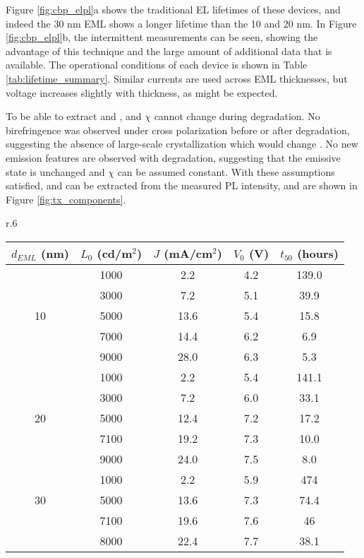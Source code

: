 \documentclass[../thesis.tex]{subfiles}
\begin{document}
Figure \ref{fig:cbp_elpl}a shows the traditional EL lifetimes of these devices, and indeed the 30 nm EML shows a longer lifetime than the 10 and 20 nm.  
In Figure \ref{fig:cbp_elpl}b, the intermittent \pl measurements can be seen, showing the advantage of this technique and the large amount of additional data that is available.
The operational conditions of each device is shown in Table \ref{tab:lifetime_summary}.
Similar currents are used across EML thicknesses, but voltage increases slightly with thickness, as might be expected.


To be able to extract \pl and \ef, \oc and $\chi$ cannot change during degradation.
No birefringence was observed under cross polarization before or after degradation, suggesting the absence of large-scale crystallization which would change \oc .  
No new emission features are observed with degradation, suggesting that the emissive state is unchanged and $\chi$ can be assumed constant.
With these assumptions satisfied, \pl and \ef can be extracted from the measured PL intensity, and are shown in Figure \ref{fig:tx_components}.


\begin{wraptable}{r}{.6\textwidth}%
\centering
\begin{tabular}{c|c|c|c|c}
$d_{EML}$ (nm) & $L_0$ (cd/m$^2$) & $J$ (mA/cm$^2$) & $V_0$ (V) & $t_{50}$ (hours) \\
\hline
& 1000 & 2.2 & 4.2 & 139.0 \\
& 3000 & 7.2 & 5.1 & 39.9 \\
10 & 5000 & 13.6 & 5.4 & 15.8 \\
& 7000 & 14.4 & 6.2 & 6.9 \\
& 9000 & 28.0 &  6.3 & 5.3 \\
\hline
& 1000 & 2.2 & 5.4 & 141.1 \\
& 3000 & 7.2 & 6.0 & 33.1 \\
20 & 5000 & 12.4 & 7.2 & 17.2 \\
& 7100 & 19.2 & 7.3 & 10.0 \\
& 9000 & 24.0 &  7.5 & 8.0 \\
\hline
& 1000 & 2.2 & 5.9 & 474 \\
30 & 5000 & 13.6 & 7.3 & 74.4\\
& 7100 & 19.6 & 7.6 & 46 \\
& 8000 & 22.4 &  7.7 & 38.1 \\

\end{tabular}
\caption{Summary of device lifetimes.  For each device, the starting luminance ($L_0$), current density ($J$), starting voltage ($V_0$) and time at which 50\% of the initial luminance is reached ($t_{50}$) are reported.}
\label{tab:lifetime_summary}
\end{wraptable}
\end{document}

